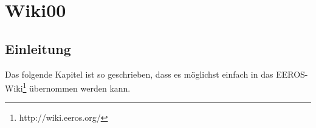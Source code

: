 \chapter{Wiki00}
\section{Einleitung}
Das folgende Kapitel ist so geschrieben, dass es möglichst einfach in das EEROS-Wiki\footnote{http://wiki.eeros.org/} übernommen werden kann.